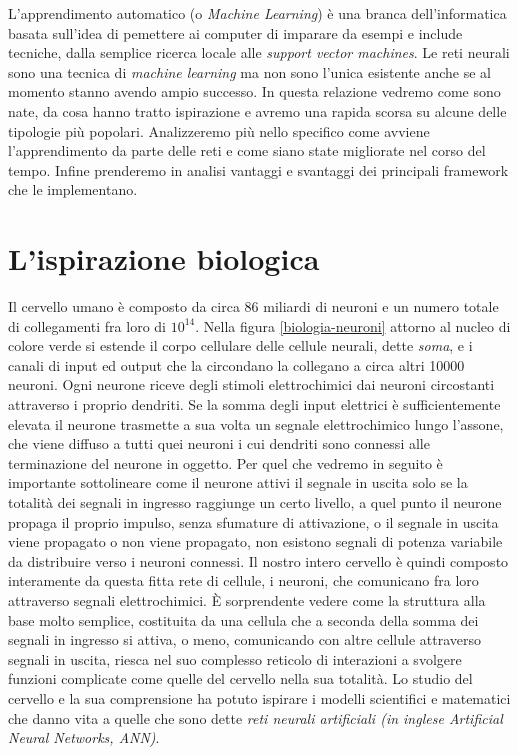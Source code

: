 L'apprendimento automatico (o \textit{Machine Learning}) è una branca dell'informatica basata sull'idea di pemettere ai computer di imparare da esempi e include tecniche, dalla semplice ricerca locale alle \textit{support vector machines}. 
 Le reti neurali sono una tecnica di \emph{machine learning} ma non sono l'unica esistente anche se al momento stanno avendo ampio successo. In questa relazione vedremo come sono nate, da cosa hanno tratto ispirazione e avremo una rapida scorsa su alcune delle tipologie più popolari. Analizzeremo più nello specifico come avviene l'apprendimento da parte delle reti e come siano state migliorate nel corso del tempo. Infine prenderemo in analisi vantaggi e svantaggi dei principali framework che le implementano.

\section{L'ispirazione biologica}
Il cervello umano è composto da circa 86 miliardi di neuroni e un numero totale di collegamenti fra loro di $10^{14}$. Nella figura \ref{biologia-neuroni} attorno al nucleo di colore verde si estende il corpo cellulare delle cellule neurali, dette \textit{soma}, e i canali di input ed output che la circondano la collegano a circa altri 10000 neuroni.
Ogni neurone riceve degli stimoli elettrochimici dai neuroni circostanti attraverso i proprio dendriti. Se la somma degli input elettrici è sufficientemente elevata il neurone trasmette a sua volta un segnale elettrochimico lungo l'assone, che viene diffuso a tutti quei neuroni i cui dendriti sono connessi alle terminazione del neurone in oggetto.
Per quel che vedremo in seguito è importante sottolineare come il neurone attivi il segnale in uscita solo se la totalità dei segnali in ingresso raggiunge un certo livello, a quel punto il neurone propaga il proprio impulso, senza sfumature di attivazione, o il segnale in uscita viene propagato o non viene propagato, non esistono segnali di potenza variabile da distribuire verso i neuroni connessi.
Il nostro intero cervello è quindi composto interamente da questa fitta rete di cellule, i neuroni, che comunicano fra loro attraverso segnali elettrochimici. \`E sorprendente vedere come la struttura alla base molto semplice, costituita da una cellula che a seconda della somma dei segnali in ingresso si attiva, o meno, comunicando con altre cellule attraverso segnali in uscita, riesca nel suo complesso reticolo di interazioni a svolgere funzioni complicate come quelle del cervello nella sua totalità.
Lo studio del cervello e la sua comprensione ha potuto ispirare i modelli scientifici e matematici che danno vita a quelle che sono dette \textit{reti neurali artificiali (in inglese \textit{Artificial Neural Networks}, ANN)}.
\vspace{2 cm}

